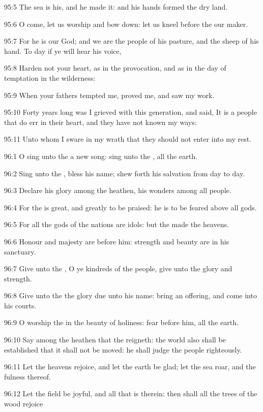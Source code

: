 95:5 The sea is his, and he made it: and his hands formed the dry
land.

95:6 O come, let us worship and bow down: let us kneel before the \LORD
our maker.

95:7 For he is our God; and we are the people of his pasture, and the
sheep of his hand. To day if ye will hear his voice,

95:8 Harden not your heart, as in the provocation, and as in the day
of temptation in the wilderness:

95:9 When your fathers tempted me, proved me, and saw my work.

95:10 Forty years long was I grieved with this generation, and said,
It is a people that do err in their heart, and they have not known my
ways:

95:11 Unto whom I sware in my wrath that they should not enter into my
rest.



96:1 O sing unto the \LORD a new song: sing unto the \LORD, all the
earth.

96:2 Sing unto the \LORD, bless his name; shew forth his salvation from
day to day.

96:3 Declare his glory among the heathen, his wonders among all
people.

96:4 For the \LORD is great, and greatly to be praised: he is to be
feared above all gods.

96:5 For all the gods of the nations are idols: but the \LORD made the
heavens.

96:6 Honour and majesty are before him: strength and beauty are in his
sanctuary.

96:7 Give unto the \LORD, O ye kindreds of the people, give unto the
\LORD glory and strength.

96:8 Give unto the \LORD the glory due unto his name: bring an
offering, and come into his courts.

96:9 O worship the \LORD in the beauty of holiness: fear before him,
all the earth.

96:10 Say among the heathen that the \LORD reigneth: the world also
shall be established that it shall not be moved: he shall judge the
people righteously.

96:11 Let the heavens rejoice, and let the earth be glad; let the sea
roar, and the fulness thereof.

96:12 Let the field be joyful, and all that is therein: then shall all
the trees of the wood rejoice


